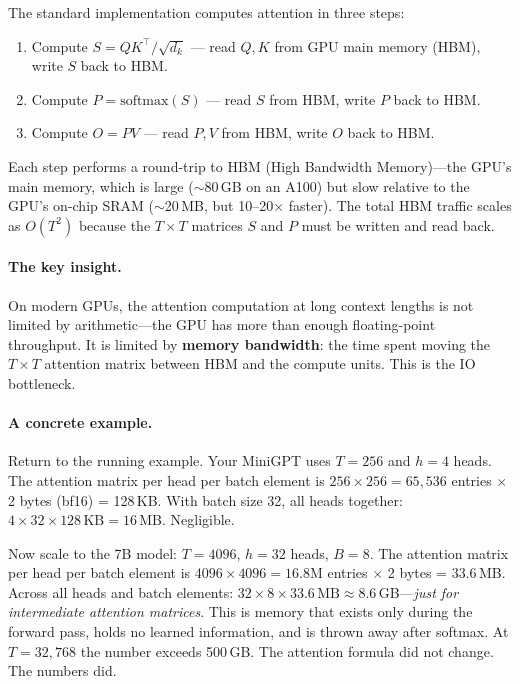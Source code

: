 The standard implementation computes attention in three steps:

\begin{enumerate}[nosep]
  \item Compute $S = QK^\top / \sqrt{d_k}$ --- read $Q, K$ from GPU main memory (HBM), write $S$ back to HBM.
  \item Compute $P = \text{softmax}(S)$ --- read $S$ from HBM, write $P$ back to HBM.
  \item Compute $O = PV$ --- read $P, V$ from HBM, write $O$ back to HBM.
\end{enumerate}

Each step performs a round-trip to HBM (High Bandwidth Memory)---the GPU's main memory, which is large ($\sim$80\,GB on an A100) but slow relative to the GPU's on-chip SRAM ($\sim$20\,MB, but 10--20$\times$ faster). The total HBM traffic scales as $O(T^2)$ because the $T \times T$ matrices $S$ and $P$ must be written and read back.

\paragraph{The key insight.} On modern GPUs, the attention computation at long context lengths is not limited by arithmetic---the GPU has more than enough floating-point throughput. It is limited by \textbf{memory bandwidth}: the time spent moving the $T \times T$ attention matrix between HBM and the compute units. This is the IO bottleneck.

\paragraph{A concrete example.} Return to the running example. Your MiniGPT uses $T = 256$ and $h = 4$ heads. The attention matrix per head per batch element is $256 \times 256 = 65{,}536$ entries $\times$ 2 bytes (bf16) = 128\,KB. With batch size 32, all heads together: $4 \times 32 \times 128\,\text{KB} = 16\,$MB. Negligible.

Now scale to the 7B model: $T = 4096$, $h = 32$ heads, $B = 8$. The attention matrix per head per batch element is $4096 \times 4096 = 16.8$M entries $\times$ 2 bytes = 33.6\,MB. Across all heads and batch elements: $32 \times 8 \times 33.6\,\text{MB} \approx 8.6\,$GB---\emph{just for intermediate attention matrices}. This is memory that exists only during the forward pass, holds no learned information, and is thrown away after softmax. At $T = 32{,}768$ the number exceeds 500\,GB. The attention formula did not change. The numbers did.

